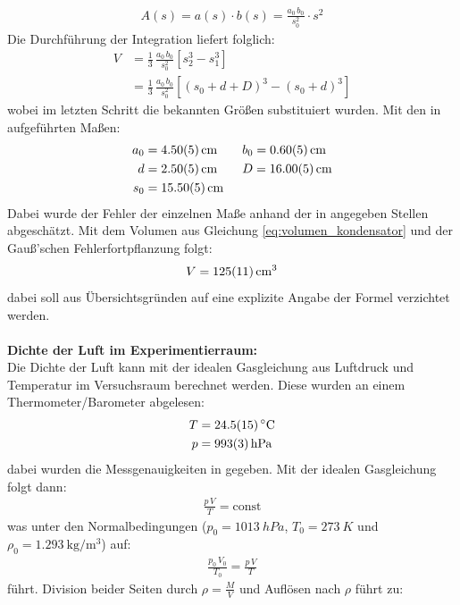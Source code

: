 \documentclass[11pt, a4paper]{article}
\numberwithin{equation}{section}
\begin{document}
\begin{align}
	A(s) = a(s) \cdot b(s) = \frac{a_0 \, b_0}{s_0^2} \cdot s^2
\end{align}
Die Durchführung der Integration liefert folglich:
\begin{align}
	V &= \frac{1}{3} \, \frac{a_0 \, b_0}{s_0^2} \left[ s_2^3 - s_1^3 \right] \nonumber\\
	  &= \frac{1}{3} \, \frac{a_0 \, b_0}{s_0^2} \left[ (s_0 + d + D)^3 - (s_0 + d)^3 \right]
	  \label{eq:volumen_kondensator}
\end{align}
wobei im letzten Schritt die bekannten Größen substituiert wurden.
Mit den in \cite{anleitung} aufgeführten Maßen:
\begin{align*}
	a_0 &= \SI{4.50 +- 0.05}{cm} \qquad b_0 = \SI{0.6 +- 0.05}{cm}\\
	d &= \SI{2.5 +- 0.05}{cm} \qquad D = \SI{16.00 +- 0.05}{cm}\\
	s_0 &= \SI{15.50 +- 0.05}{cm}
\end{align*}
Dabei wurde der Fehler der einzelnen Maße anhand der in \cite{anleitung} angegeben Stellen abgeschätzt.
Mit dem Volumen aus Gleichung \eqref{eq:volumen_kondensator} und der Gauß'schen Fehlerfortpflanzung folgt:
\begin{align}
	V = \SI{125 +- 11}{\centi\meter\cubed}
\end{align}
dabei soll aus Übersichtsgründen auf eine explizite Angabe der Formel verzichtet werden.\\
\\
\textbf{Dichte der Luft im Experimentierraum:}\\
Die Dichte der Luft kann mit der idealen Gasgleichung aus Luftdruck und Temperatur im Versuchsraum berechnet werden.
Diese wurden an einem Thermometer/Barometer abgelesen:
\begin{align}
	T &= \SI{24.5 +- 1.5}{\degreeCelsius} \\
	p &= \SI{993 +- 3}{hPa}
\end{align}
dabei wurden die Messgenauigkeiten in \cite{anleitung} gegeben.
Mit der idealen Gasgleichung folgt dann:
\begin{align*}
	\frac{p \, V}{T} = \mathrm{const}
\end{align*}
was unter den Normalbedingungen ($p_0 = \SI{1013}{hPa}$, $T_0 = \SI{273}{K}$ und $\rho_0 = \SI{1.293}{\kilogram\per\metre\cubed}$) auf:
\begin{align*}
	\frac{p_0 \, V_0}{T_0} = \frac{p \, V}{T}
\end{align*}
führt.
Division beider Seiten durch $\rho = \frac{M}{V}$ und Auflösen nach $\rho$ führt zu:
\end{document}

